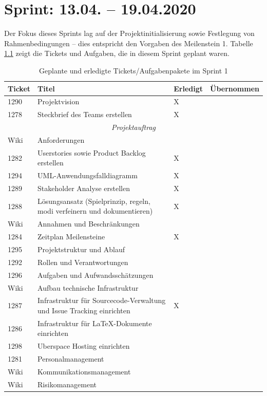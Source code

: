 \documentclass[a4paper,11pt,listof=numbered,glossary=totoc,parskip=half,toc=bib]{scrreprt}
\begin{document}
	\setcounter{lastRomanCounter}{\value{chapter}} %
	\newpage
	\renewcommand \thechapter{\arabic{chapter}}
	\setcounter{chapter}{0}


    \chapter{Sprint: 13.04. – 19.04.2020}
    
    Der Fokus dieses Sprints lag auf der Projektinitialisierung sowie Festlegung von Rahmenbedingungen – dies entspricht den Vorgaben des Meilenstein 1. Tabelle \ref{tab:sprint1} zeigt die Tickets und Aufgaben, die in diesem Sprint geplant waren.
    
\begin{table}
    \begin{tabularx}{\textwidth}{lXll}
			\toprule
			\textbf{Ticket} & \textbf{Titel} & \textbf{Erledigt} & \textbf{Übernommen} \\
			\midrule
		1290	&	Projektvision	&	X	&		\\
		1278	&	Steckbrief des Teams erstellen	&	X	&		\\
		\midrule
		\multicolumn{4}{c}{\textit{Projektauftrag}}\\
		\midrule
		Wiki	&	Anforderungen 	&		&		\\
		1282	&	Userstories sowie Product Backlog erstellen	&	X	&		\\
		1294	&	UML-Anwendungsfalldiagramm	&	X	&		\\
		1289	&	Stakeholder Analyse erstellen	&	X	&		\\
		1288	&	Lösungsansatz (Spielprinzip, regeln, modi verfeinern und dokumentieren)	&	X	&		\\
		Wiki	&	Annahmen und Beschränkungen	&		&		\\
		1284	&	Zeitplan Meilensteine	&	X	&		\\
		1295	&	Projektstruktur und Ablauf	&		&		\\
		1292	&	Rollen und Verantwortungen	&		&		\\
		1296	&	Aufgaben und Aufwandsschätzungen	&		&		\\
		Wiki	&	Aufbau technische Infrastruktur	&		&		\\
		1287	&	Infrastruktur für Sourcecode-Verwaltung und Issue Tracking einrichten	&	X	&		\\
		1286	&	Infrastruktur für LaTeX-Dokumente einrichten	&		&		\\
		1298	&	Uberspace Hosting einrichten	&		&		\\
		1281	&	Personalmanagement	&		&		\\
		Wiki	&	Kommunikationsmanagement	&		&		\\
		Wiki	&	Risikomanagement	&		&		\\

			\bottomrule
		\end{tabularx}
\caption{Geplante und erledigte Tickets/Aufgabenpakete im Sprint 1}
\label{tab:sprint1}
\end{table}
    
\end{document}
